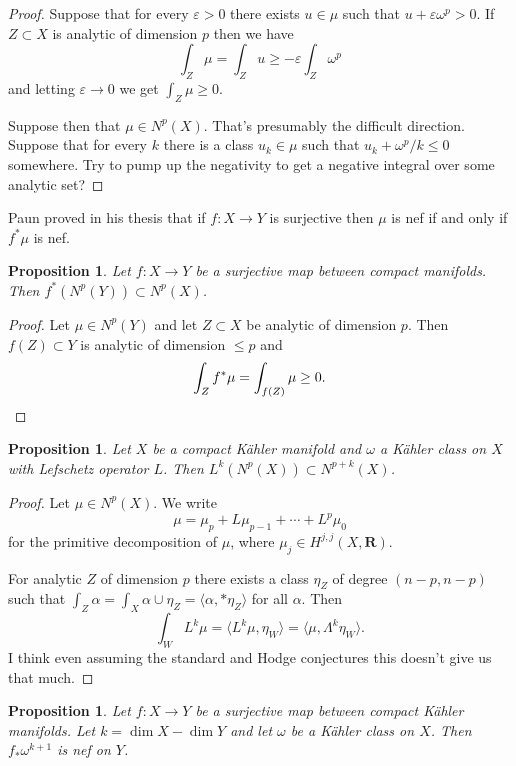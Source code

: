 \documentclass[11pt]{amsart}
\newtheorem{prop}[theo]{Proposition}
\theoremstyle{definition}
\def\eps{\varepsilon}
\def\RR{\mathbf{R}}
\def\<{\langle}
\def\>{\rangle}
\begin{document}
\begin{proof}
Suppose that for every $\eps > 0$ there exists $u \in \mu$ such that $u + \eps \omega^p > 0$.
If $Z \subset X$ is analytic of dimension $p$ then we have
\[
\int_Z \mu
= \int_Z u
\geq -\eps \int_Z \omega^p
\]
and letting $\eps \to 0$ we get $\int_Z \mu \geq 0$.

Suppose then that $\mu \in N^p(X)$.
That's presumably the difficult direction.
Suppose that for every $k$ there is a class $u_k \in \mu$ such that $u_k + \omega^p/k \leq 0$ somewhere.
Try to pump up the negativity to get a negative integral over some analytic set?
\end{proof}


Paun proved in his thesis that if $f : X \to Y$ is surjective then $\mu$ is nef if and only if $f^*\mu$ is nef.




\begin{prop}
Let $f : X \to Y$ be a surjective map between compact manifolds.
Then $f^*(N^p(Y)) \subset N^p(X)$.
\end{prop}

\begin{proof}
Let $\mu \in N^p(Y)$ and let $Z \subset X$ be analytic of dimension $p$.
Then $f(Z) \subset Y$ is analytic of dimension $\leq p$ and
\[
\int_Z f^*\mu
= \int_{f(Z)} \mu \geq 0.
\qedhere
\]
\end{proof}


\begin{prop}
Let $X$ be a compact K\"ahler manifold and $\omega$ a K\"ahler class on $X$ with Lefschetz operator $L$.
Then $L^k(N^p(X)) \subset N^{p+k}(X)$.
\end{prop}

\begin{proof}
Let $\mu \in N^p(X)$.
We write 
\[
\mu = \mu_p + L\mu_{p-1} + \cdots + L^p \mu_0
\]
for the primitive decomposition of $\mu$, where $\mu_j \in H^{j,j}(X,\RR)$.

For analytic $Z$ of dimension $p$ there exists a class $\eta_Z$ of degree $(n-p,n-p)$ such that $\int_Z \alpha = \int_X \alpha \cup \eta_Z = \<\alpha, *\eta_Z\>$ for all $\alpha$.
Then
\[
\int_W L^k \mu
= \< L^k \mu, \eta_W \>
= \< \mu, \Lambda^k \eta_W \>.
\]
I think even assuming the standard and Hodge conjectures this doesn't give us that much.
\end{proof}



\begin{prop}
Let $f : X \to Y$ be a surjective map between compact K\"ahler manifolds.
Let $k = \dim X - \dim Y$ and let $\omega$ be a K\"ahler class on $X$.
Then $f_*\omega^{k+1}$ is nef on $Y$.
\end{prop}
\end{document}
